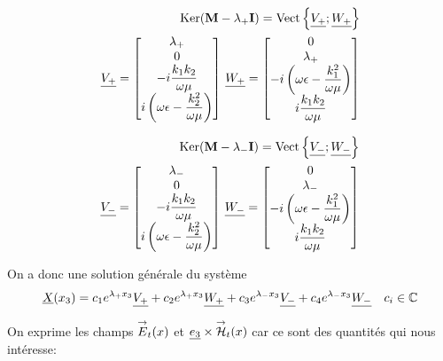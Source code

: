 \begin{align}
\operatorname{Ker}(\mathbf{M}-\lambda_+\mathbf{I})=\operatorname{Vect}\left\lbrace\underline{V_+};\underline{W_+}\right\rbrace \\
    \underline{V_+} = 
    \begin{bmatrix}
    \lambda_+ \\
        0 \\
        -i\dfrac{k_1k_2}{\omega\mu} \\
        i\left(\omega\epsilon - \dfrac{k_2^2}{\omega\mu}\right) \\
    \end{bmatrix}
    \,
    \underline{W_+} = 
        \begin{bmatrix}
        0 \\
        \lambda_+ \\
        -i\left(\omega\epsilon - \dfrac{k_1^2}{\omega\mu}\right) \\
        i\dfrac{k_1k_2}{\omega\mu} \\
    \end{bmatrix}
\end{align}

\begin{align}
\operatorname{Ker}(\mathbf{M}-\lambda_-\mathbf{I})=\operatorname{Vect}\left\lbrace\underline{V_-};\underline{W_-}\right\rbrace\\
    \underline{V_-} = 
    \begin{bmatrix}
        \lambda_- \\
        0 \\
        -i\dfrac{k_1k_2}{\omega\mu} \\
        i\left(\omega\epsilon - \dfrac{k_2^2}{\omega\mu}\right) \\
    \end{bmatrix}
    \,
    \underline{W_-} = 
    \begin{bmatrix}
        0 \\
        \lambda_- \\
        -i\left(\omega\epsilon - \dfrac{k_1^2}{\omega\mu}\right) \\
        i\dfrac{k_1k_2}{\omega\mu} \\
    \end{bmatrix}
\end{align}

On a donc une solution générale du système 
\begin{equation}
    \underline{X}(x_3) = c_1e^{\lambda_+ x_3}\underline{V_+}  + c_2e^{\lambda_+ x_3}\underline{W_+} + c_3e^{\lambda_- x_3}\underline{V_-} +c_4e^{\lambda_- x_3}\underline{W_-} \quad c_i \in \mathbb C
\end{equation}

On exprime les champs ${\overset{\rightarrow}{E}}_t(x)$ et $\underline{e_3} \times {\overset{\rightarrow}{\mathcal{H}}}_t(x)$ car ce sont des quantités qui nous intéresse:

